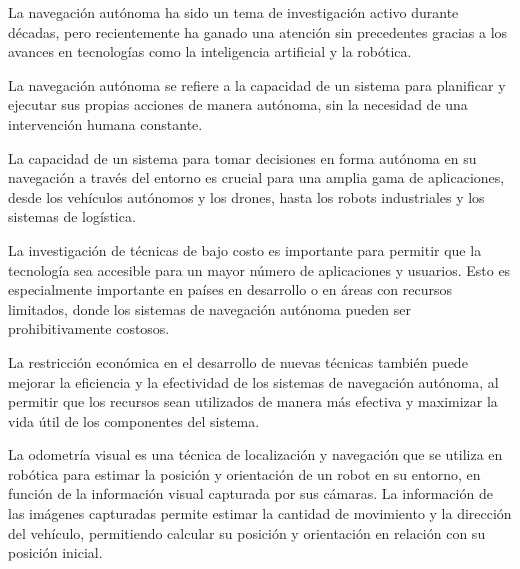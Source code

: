\documentclass[
11pt, %
codirector, %
]{charter}
\begin{document}



La navegación autónoma ha sido un tema de investigación activo durante décadas, pero recientemente ha ganado una atención sin precedentes gracias a los avances en tecnologías como la inteligencia artificial y la robótica.

La navegación autónoma se refiere a la capacidad de un sistema para planificar y ejecutar sus propias acciones de manera autónoma, sin la necesidad de una intervención humana constante.

La capacidad de un sistema para tomar decisiones en forma autónoma en su navegación a través del entorno es crucial para una amplia gama de aplicaciones, desde los vehículos autónomos y los drones, hasta los robots industriales y los sistemas de logística.

La investigación de técnicas de bajo costo es importante para permitir que la tecnología sea accesible para un mayor número de aplicaciones y usuarios. Esto es especialmente importante en países en desarrollo o en áreas con recursos limitados, donde los sistemas de navegación autónoma pueden ser prohibitivamente costosos. 

La restricción económica en el desarrollo de nuevas técnicas también puede mejorar la eficiencia y la efectividad de los sistemas de navegación autónoma, al permitir que los recursos sean utilizados de manera más efectiva y maximizar la vida útil de los componentes del sistema.

La odometría visual es una técnica de localización y navegación que se utiliza en robótica para estimar la posición y orientación de un robot en su entorno, en función de la información visual capturada por sus cámaras. La información de las imágenes capturadas permite estimar la cantidad de movimiento y la dirección del vehículo, permitiendo calcular su posición y orientación en relación con su posición inicial.
\end{document}
